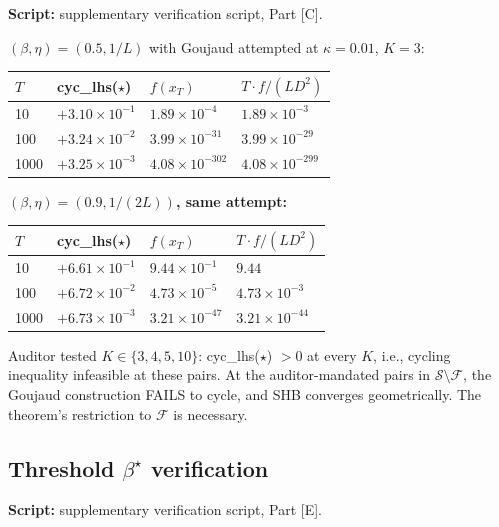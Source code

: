 \documentclass[11pt,a4paper]{article}
\theoremstyle{plain}
\theoremstyle{definition}
\theoremstyle{remark}
\newcommand{\F}{\mathcal{F}}
\newcommand{\Sset}{\mathcal{S}}
\begin{document}
\textbf{Script:} supplementary verification script, Part [C].

\textbf{$(\beta,\eta) = (0.5, 1/L)$} with Goujaud attempted at $\kappa = 0.01$, $K = 3$:

\begin{center}
\begin{tabular}{@{}llll@{}}
\toprule
$T$  & cyc\_lhs($\star$) & $f(x_T)$ & $T \cdot f/(LD^2)$ \\
\midrule
10   & $+3.10 \times 10^{-1}$ & $1.89 \times 10^{-4}$  & $1.89 \times 10^{-3}$  \\
100  & $+3.24 \times 10^{-2}$ & $3.99 \times 10^{-31}$ & $3.99 \times 10^{-29}$ \\
1000 & $+3.25 \times 10^{-3}$ & $4.08 \times 10^{-302}$ & $4.08 \times 10^{-299}$ \\
\bottomrule
\end{tabular}
\end{center}

\textbf{$(\beta,\eta) = (0.9, 1/(2L))$, same attempt:}

\begin{center}
\begin{tabular}{@{}llll@{}}
\toprule
$T$  & cyc\_lhs($\star$) & $f(x_T)$ & $T \cdot f/(LD^2)$ \\
\midrule
10   & $+6.61 \times 10^{-1}$ & $9.44 \times 10^{-1}$  & $9.44$               \\
100  & $+6.72 \times 10^{-2}$ & $4.73 \times 10^{-5}$  & $4.73 \times 10^{-3}$ \\
1000 & $+6.73 \times 10^{-3}$ & $3.21 \times 10^{-47}$ & $3.21 \times 10^{-44}$ \\
\bottomrule
\end{tabular}
\end{center}

Auditor tested $K \in \{3, 4, 5, 10\}$: cyc\_lhs($\star$) $> 0$ at every $K$, i.e., cycling inequality infeasible at these pairs. At the auditor-mandated pairs in $\Sset\setminus\F$, the Goujaud construction FAILS to cycle, and SHB converges geometrically. The theorem's restriction to $\F$ is necessary.

\subsection{Threshold $\beta^\star$ verification}

\textbf{Script:} supplementary verification script, Part [E].
\end{document}
